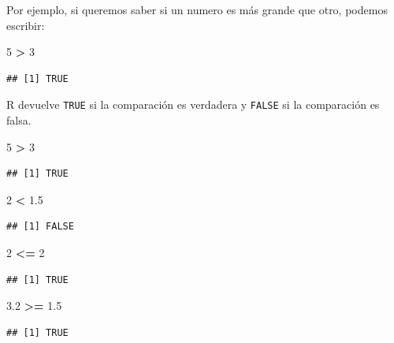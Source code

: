 \documentclass[]{book}
\newenvironment{Shaded}{\begin{snugshade}}{\end{snugshade}}
\newcommand{\DecValTok}[1]{\textcolor[rgb]{0.00,0.00,0.81}{#1}}
\newcommand{\FloatTok}[1]{\textcolor[rgb]{0.00,0.00,0.81}{#1}}
\newcommand{\StringTok}[1]{\textcolor[rgb]{0.31,0.60,0.02}{#1}}
\newcommand{\OperatorTok}[1]{\textcolor[rgb]{0.81,0.36,0.00}{\textbf{#1}}}
\begin{document}
Por ejemplo, si queremos saber si un numero es más grande que otro,
podemos escribir:

\begin{Shaded}
\begin{Highlighting}[]
\DecValTok{5} \OperatorTok{>}\StringTok{ }\DecValTok{3} 
\end{Highlighting}
\end{Shaded}

\begin{verbatim}
## [1] TRUE
\end{verbatim}

R devuelve \texttt{TRUE} si la comparación es verdadera y \texttt{FALSE}
si la comparación es falsa.

\begin{Shaded}
\begin{Highlighting}[]
\DecValTok{5} \OperatorTok{>}\StringTok{ }\DecValTok{3}
\end{Highlighting}
\end{Shaded}

\begin{verbatim}
## [1] TRUE
\end{verbatim}

\begin{Shaded}
\begin{Highlighting}[]
\DecValTok{2} \OperatorTok{<}\StringTok{ }\FloatTok{1.5}
\end{Highlighting}
\end{Shaded}

\begin{verbatim}
## [1] FALSE
\end{verbatim}

\begin{Shaded}
\begin{Highlighting}[]
\DecValTok{2} \OperatorTok{<=}\StringTok{ }\DecValTok{2}
\end{Highlighting}
\end{Shaded}

\begin{verbatim}
## [1] TRUE
\end{verbatim}

\begin{Shaded}
\begin{Highlighting}[]
\FloatTok{3.2} \OperatorTok{>=}\StringTok{ }\FloatTok{1.5}
\end{Highlighting}
\end{Shaded}

\begin{verbatim}
## [1] TRUE
\end{verbatim}
\end{document}

